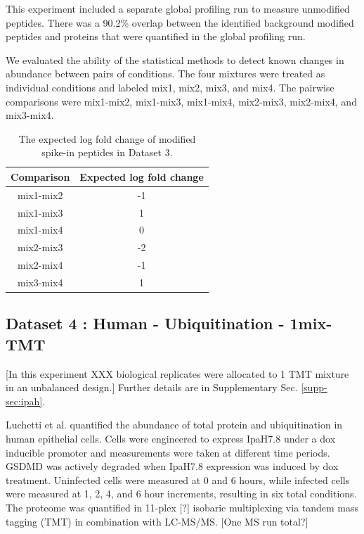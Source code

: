 \documentclass[mcp]{article}
\numberwithin{table}{section}
\def\todo#1{{\color{red}[#1]}}
\begin{document}
\medskip {} This experiment included a separate global profiling run to measure unmodified peptides. There was a 90.2\% overlap between the identified background modified peptides and proteins that were quantified in the global profiling run.

\medskip {} We evaluated the ability of the statistical methods to detect known changes in abundance between pairs of conditions. The four mixtures were treated as individual conditions and labeled mix1, mix2, mix3, and mix4. The pairwise comparisons were mix1-mix2, mix1-mix3, mix1-mix4, mix2-mix3, mix2-mix4, and mix3-mix4. 


\begin{table}[h!]
\centering
\begin{tabular}{| c | c |}
\hline
 Comparison & Expected log fold change\\ [0.5ex]
 \hline\hline
 mix1-mix2 & -1\\
 \hline
 mix1-mix3 & 1\\
\hline
 mix1-mix4 & 0\\
\hline
 mix2-mix3 & -2\\
\hline
 mix2-mix4 & -1\\
\hline
 mix3-mix4 & 1\\
\hline
\end{tabular}
\caption{The expected log fold change of modified spike-in peptides in Dataset 3.}
\label{table:spikein_fold_change}
\end{table}


\subsection*{Dataset 4 : Human - Ubiquitination - 1mix-TMT}
\label{sec:exp_proc_dataset4}
\todo{In this experiment XXX biological replicates were allocated to 1 TMT mixture in an unbalanced design.} Further details are in Supplementary Sec. \ref{supp-sec:ipah}. 


\medskip {} Luchetti et al. \cite{LUCHETTI2021} quantified the abundance of total protein and ubiquitination in human epithelial cells. Cells were engineered to express IpaH7.8 under a dox inducible promoter and measurements were taken at different time periods. GSDMD was actively degraded when IpaH7.8 expression was induced by dox treatment. Uninfected cells were measured at 0 and 6 hours, while infected cells were measured at 1, 2, 4, and 6 hour increments, resulting in six total conditions. The proteome was quantified in 11-plex \todo{?} isobaric multiplexing via tandem mass tagging (TMT) in combination with LC-MS/MS. \todo{One MS run total?}
\end{document}
